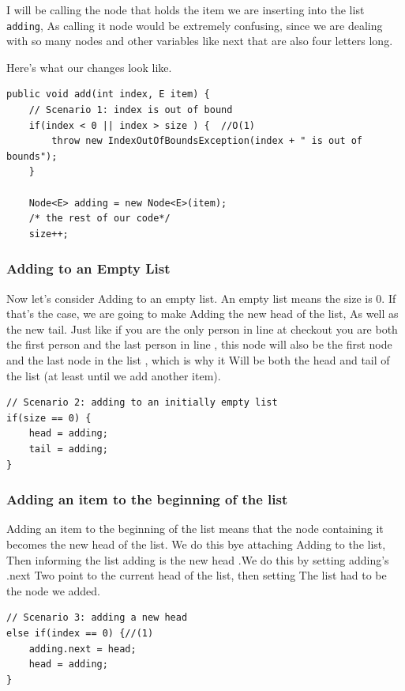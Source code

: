 \documentclass[10pt,a4paper]{book}
\begin{document}
I will be calling the node that holds the item we are inserting into the list \texttt{adding}, As calling it node would be extremely confusing, since we are dealing with so many nodes and other variables like next that are also four letters long.

Here's what our changes look like.

\begin{verbatim}
public void add(int index, E item) {
	// Scenario 1: index is out of bound
	if(index < 0 || index > size ) {  //O(1)
		throw new IndexOutOfBoundsException(index + " is out of bounds");
	}
	
	Node<E> adding = new Node<E>(item);
	/* the rest of our code*/
	size++;
\end{verbatim}



\subsubsection{Adding to an Empty List}
Now let's consider Adding to an empty list.  An empty list means the size is 0.  If that's the case, we are going to make Adding the new head of the list, As well as the new tail.  Just like if you are the only person in line at checkout you are both the first person and the last person in line , this node will also be the first node and the last node in the list , which is why it Will be both the head and tail of the list (at least until we add another item).

\begin{verbatim}
// Scenario 2: adding to an initially empty list
if(size == 0) {
	head = adding;
	tail = adding;
}	
\end{verbatim}



\subsubsection{Adding an item to the beginning of the list}
Adding an item to the beginning of the list means that the node containing it becomes the new head of the list.  We do this bye attaching Adding to the list, Then informing the list adding is the new head .We do this by setting adding's .next Two point to the current head of the list, then setting The list had to be the node we added.

\begin{verbatim}
// Scenario 3: adding a new head
else if(index == 0) {//(1)
	adding.next = head;
	head = adding;
}
\end{verbatim}
\end{document}
